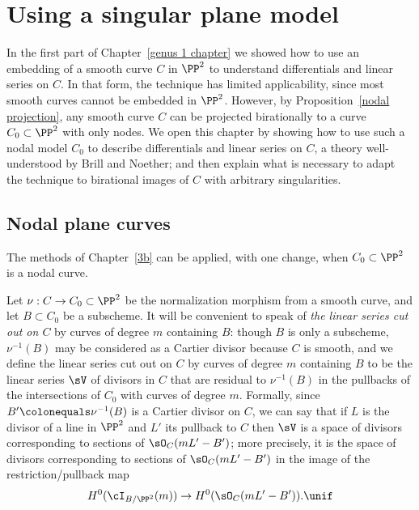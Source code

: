 

\chapter{Using a singular plane model}
\label{PlaneCurvesChapter}
\label{PlaneCurveChapter}


In the first part of Chapter~\ref{genus 1 chapter} we showed how to
use an embedding of a smooth curve $C$ 
in $\PP^2$ to understand differentials and linear series on $C$. 
In that form,
the technique 
has limited applicability,
since most smooth curves cannot be embedded in
$\PP^2$.
However, by Proposition~\ref{nodal projection},
 any smooth curve $C$ can be projected 
birationally to a curve $C_0\subset\PP^2$ with only nodes. 
We open this chapter by showing
how to use such a nodal model $C_0$ to describe differentials and
linear series on $C$, a theory well-understood 
by Brill and Noether;  and then explain
what is necessary to adapt the technique to birational images of $C$
with arbitrary singularities. 

\section{Nodal plane curves}\label{nodal curves section}

The methods of Chapter~\ref{3b}
 can be applied, with one change, when $C_{0}\subset \PP^{2}$
%
is a nodal curve. 

Let $\nu: C\to C_{0}\subset \PP^{2}$ be the 
%
normalization morphism from a smooth curve,
and let $B\subset C_{0}$ be a subscheme.
It will be convenient to speak of 
%
\emph{the linear series cut out on $C$} by curves of degree $m$
containing $B$: though $B$ is only a subscheme, $\nu^{-1}(B)$ may be
considered as a 
Cartier divisor
%
 because
$C$ is smooth, and we define
the linear series cut out on $C$ by curves of degree $m$
containing $B$ to be
the linear series  $\sV$ of divisors in $C$ that are residual to $\nu^{-1}(B)$ in the pullbacks 
of the intersections of $C_{0}$ with curves of degree $m$. 
Formally, since $B' \colonequals  \nu^{-1}(B)$
is a Cartier divisor on $C$, we can say that if $L$ is the divisor of a line in $\PP^{2}$ and $L'$
its pullback to $C$ then
$\sV$ is a space of divisors corresponding to
sections of $\sO_{C}(mL'-B')$; more precisely, it is the space of divisors corresponding to
sections of $\sO_{C}(mL'-B')$ in the image of the restriction/pullback map
$$
H^0(\cI_{B/\PP^2}(m)) \to H^0(\sO_{C}(mL'-B')).
\unif
$$

